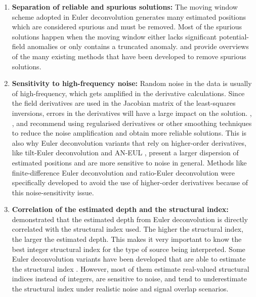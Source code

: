 \begin{enumerate}

\item \textbf{Separation of reliable and spurious solutions:}
The moving window scheme adopted in Euler deconvolution generates many estimated positions which are considered spurious and must be removed.
Most of the spurious solutions happen when the moving window either lacks significant potential-field anomalies or only contains 
a truncated anomaly.
\citet{FitzGerald2004} and \citet{Melo2020} provide overviews of the many existing methods that have been developed to remove spurious solutions.

\item \textbf{Sensitivity to high-frequency noise:} Random noise in the data is usually of high-frequency, which gets amplified in the derivative calculations. Since the field derivatives are used in the Jacobian matrix of the least-squares inversions, errors in the derivatives will have a large impact on the solution.
\citet{Pasteka2009}, \citet{Saleh2012}, and \citet{Florio2014} recommend using regularised derivatives or other smoothing techniques to reduce the noise amplification and obtain more reliable solutions.
This is also why Euler deconvolution variants that rely on higher-order derivatives, like tilt-Euler deconvolution \citep{Salem2007,Huang2019} and AN-EUL \citep{Salem2003}, present a larger dispersion of estimated positions and are more sensitive to noise in general.
Methods like finite-difference Euler deconvolution \citep{Gerovska2005} and ratio-Euler deconvolution \citep{Huang2022} were specifically developed to avoid the use of higher-order derivatives because of this noise-sensitivity issue.

\item \textbf{Correlation of the estimated depth and the structural index:}
\citet{Silva2001} demonstrated that the estimated depth from Euler deconvolution is directly correlated with the structural index used.
The higher the structural index, the larger the estimated depth.
This makes it very important to know the best integer structural index for the type of source being interpreted.
Some Euler deconvolution variants have been developed that are able to estimate the structural index \citep[e.g.,][]{Melo2013,Melo2018,Salem2003,Salem2007,Gerovska2005,Silva2003,Florio2013,Florio2014}.
However, most of them estimate real-valued structural indices instead of integers, are sensitive to noise, and tend to underestimate the structural index under realistic noise and signal overlap scenarios.

\end{enumerate}

